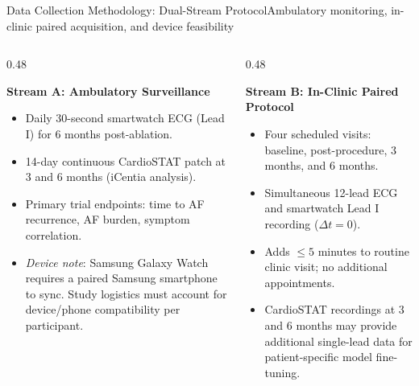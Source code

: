 \documentclass[aspectratio=169,10pt]{beamer}
\begin{document}
\begin{frame}{Data Collection Methodology: Dual-Stream Protocol}{Ambulatory monitoring, in-clinic paired acquisition, and device feasibility}
\begin{columns}[T]
  \begin{column}{0.48\textwidth}
    \begin{block}{\textbf{Stream A: Ambulatory Surveillance}}
      \scriptsize
      \begin{itemize}
        \setlength{\itemsep}{0.2em}
        \item Daily 30-second smartwatch ECG (Lead I) for 6 months post-ablation.
        \item 14-day continuous CardioSTAT patch at 3 and 6 months (iCentia analysis).
        \item Primary trial endpoints: time to AF recurrence, AF burden, symptom correlation.
        \item \textit{Device note}: Samsung Galaxy Watch requires a paired Samsung smartphone to sync. Study logistics must account for device/phone compatibility per participant.
      \end{itemize}
    \end{block}
  \end{column}
  \begin{column}{0.48\textwidth}
    \begin{block}{\textbf{Stream B: In-Clinic Paired Protocol}}
      \scriptsize
      \begin{itemize}
        \setlength{\itemsep}{0.2em}
        \item Four scheduled visits: baseline, post-procedure, 3 months, and 6 months.
        \item Simultaneous 12-lead ECG and smartwatch Lead I recording ($\Delta t = 0$).
        \item Adds $\le 5$ minutes to routine clinic visit; no additional appointments.
        \item CardioSTAT recordings at 3 and 6 months may provide additional single-lead data for patient-specific model fine-tuning.
      \end{itemize}
    \end{block}
  \end{column}
\end{columns}

\end{frame}
\end{document}
